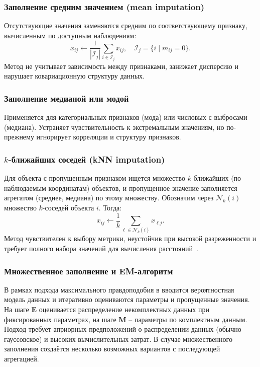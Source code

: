 \subsubsection{Заполнение средним значением (mean imputation)}

Отсутствующие значения заменяются средним по соответствующему признаку, вычисленным по доступным наблюдениям:
\[
x_{ij} \leftarrow \frac{1}{|\mathcal{I}_j|} \sum_{i \in \mathcal{I}_j} x_{ij}, \quad \mathcal{I}_j = \{ i \mid m_{ij} = 0 \}.
\]
Метод не учитывает зависимость между признаками, занижает дисперсию и нарушает ковариационную структуру данных.

\subsubsection{Заполнение медианой или модой}

Применяется для категориальных признаков (мода) или числовых с выбросами (медиана). Устраняет чувствительность к экстремальным значениям, но по-прежнему игнорирует корреляции и структуру признаков.

\subsubsection{\(k\)-ближайших соседей (kNN imputation)}

Для объекта с пропущенным признаком ищется множество \(k\) ближайших (по наблюдаемым координатам) объектов, и пропущенное значение заполняется агрегатом (среднее, медиана) по этому множеству. Обозначим через \( \mathcal{N}_k(i) \) множество \(k\)-соседей объекта \(i\). Тогда:
\[
x_{ij} \leftarrow \frac{1}{k} \sum_{\ell \in \mathcal{N}_k(i)} x_{\ell j}.
\]
Метод чувствителен к выбору метрики, неустойчив при высокой разреженности и требует полного набора значений для вычисления расстояний~\cite{pujianto2019k}.

\subsubsection{Множественное заполнение и EM-алгоритм}

В рамках подхода максимального правдоподобия в \cite{dempster1977maximum} вводится вероятностная модель данных и итеративно оцениваются параметры и пропущенные значения. На шаге \textbf{E} оценивается распределение некомплектных данных при фиксированных параметрах, на шаге \textbf{M} -- параметры по комплектным данным. Подход требует априорных предположений о распределении данных (обычно гауссовское) и высоких вычислительных затрат. В случае множественного заполнения \cite{rubin1988overview} создаётся несколько возможных вариантов с последующей агрегацией.

